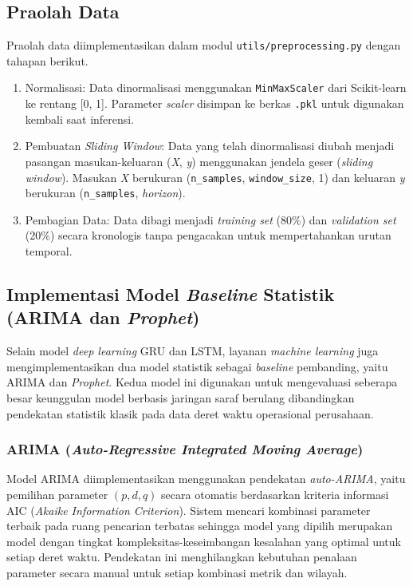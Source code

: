 \subsection{Praolah Data}
\label{subsec:praolah-data}

Praolah data diimplementasikan dalam modul \texttt{utils/}\allowbreak\texttt{preprocessing.py} dengan tahapan berikut.

\begin{enumerate}
    \item Normalisasi: Data dinormalisasi menggunakan \texttt{MinMaxScaler} dari Scikit-learn ke rentang [0, 1]. Parameter \textit{scaler} disimpan ke berkas \texttt{.pkl} untuk digunakan kembali saat inferensi.
    \item Pembuatan \textit{Sliding Window}: Data yang telah dinormalisasi diubah menjadi pasangan masukan-keluaran (\textit{X}, \textit{y}) menggunakan jendela geser (\textit{sliding window}). Masukan \textit{X} berukuran (\texttt{n\_samples}, \texttt{window\_size}, 1) dan keluaran \textit{y} berukuran (\texttt{n\_samples}, \textit{horizon}).
    \item Pembagian Data: Data dibagi menjadi \textit{training set} (80\%) dan \textit{validation set} (20\%) secara kronologis tanpa pengacakan untuk mempertahankan urutan temporal.
\end{enumerate}

\subsection{Implementasi Model \textit{Baseline} Statistik (ARIMA dan \textit{Prophet})}
\label{subsec:impl-baseline}

Selain model \textit{deep learning} GRU dan LSTM, layanan \textit{machine learning} juga mengimplementasikan dua model statistik sebagai \textit{baseline} pembanding, yaitu ARIMA dan \textit{Prophet}. Kedua model ini digunakan untuk mengevaluasi seberapa besar keunggulan model berbasis jaringan saraf berulang dibandingkan pendekatan statistik klasik pada data deret waktu operasional perusahaan.

\subsubsection{ARIMA (\textit{Auto-Regressive Integrated Moving Average})}

Model ARIMA diimplementasikan menggunakan pendekatan \textit{auto-ARIMA}, yaitu pemilihan parameter $(p, d, q)$ secara otomatis berdasarkan kriteria informasi AIC (\textit{Akaike Information Criterion}). Sistem mencari kombinasi parameter terbaik pada ruang pencarian terbatas sehingga model yang dipilih merupakan model dengan tingkat kompleksitas-keseimbangan kesalahan yang optimal untuk setiap deret waktu. Pendekatan ini menghilangkan kebutuhan penalaan parameter secara manual untuk setiap kombinasi metrik dan wilayah.

